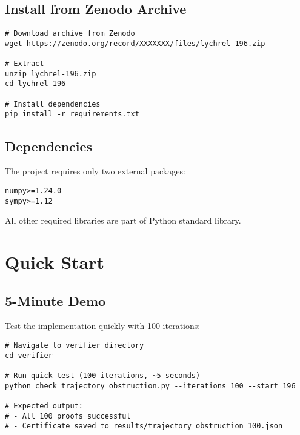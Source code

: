 \documentclass[11pt,a4paper]{article}
\begin{document}
\subsection{Install from Zenodo Archive}

\begin{lstlisting}[style=bashstyle, caption={Installation from Zenodo}]
# Download archive from Zenodo
wget https://zenodo.org/record/XXXXXXX/files/lychrel-196.zip

# Extract
unzip lychrel-196.zip
cd lychrel-196

# Install dependencies
pip install -r requirements.txt
\end{lstlisting}

\subsection{Dependencies}

The project requires only two external packages:

\begin{lstlisting}[style=bashstyle]
numpy>=1.24.0
sympy>=1.12
\end{lstlisting}

All other required libraries are part of Python standard library.

\section{Quick Start}

\subsection{5-Minute Demo}

Test the implementation quickly with 100 iterations:

\begin{lstlisting}[style=bashstyle, caption={Quick Demo (100 iterations)}]
# Navigate to verifier directory
cd verifier

# Run quick test (100 iterations, ~5 seconds)
python check_trajectory_obstruction.py --iterations 100 --start 196

# Expected output:
# - All 100 proofs successful
# - Certificate saved to results/trajectory_obstruction_100.json
\end{lstlisting}
\end{document}
